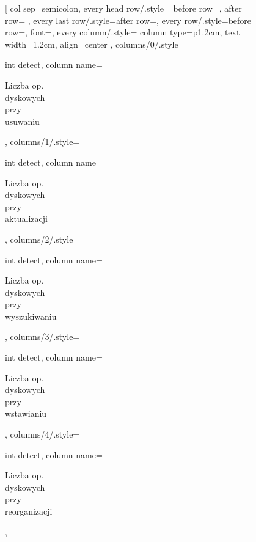 \documentclass[12pt]{article}
\begin{document}
\begin{figure}[h]
\begin{adjustbox}{width=1.25\textwidth, center}
\pgfplotstabletypeset[
    col sep=semicolon,
    every head row/.style={
        before row=\hline,
        after row=\hline
    },
    every last row/.style={after row=\hline},
    every row/.style={before row=\vspace{-2pt}},
    font=\footnotesize,
    every column/.style={
        column type=p{1.2cm},
        text width=1.2cm,
        align=center
    },
    columns/0/.style={int detect, column name={\begin{sideways}\footnotesize\hspace{0.3cm}Liczba op.\\ dyskowych\\ przy\\ usuwaniu\hspace{0.3cm}\end{sideways}}},
    columns/1/.style={int detect, column name={\begin{sideways}\footnotesize\hspace{0.3cm}Liczba op.\\ dyskowych\\ przy\\ aktualizacji\hspace{0.3cm}\end{sideways}}},
    columns/2/.style={int detect, column name={\begin{sideways}\footnotesize\hspace{0.3cm}Liczba op.\\ dyskowych\\ przy\\ wyszukiwaniu\hspace{0.3cm}\end{sideways}}},
    columns/3/.style={int detect, column name={\begin{sideways}\footnotesize\hspace{0.3cm}Liczba op.\\ dyskowych\\ przy\\ wstawianiu\hspace{0.3cm}\end{sideways}}},
    columns/4/.style={int detect, column name={\begin{sideways}\footnotesize\hspace{0.3cm}Liczba op.\\ dyskowych\\ przy\\ reorganizacji\hspace{0.3cm}\end{sideways}}},

\end{adjustbox}
\end{figure}
\end{document}
